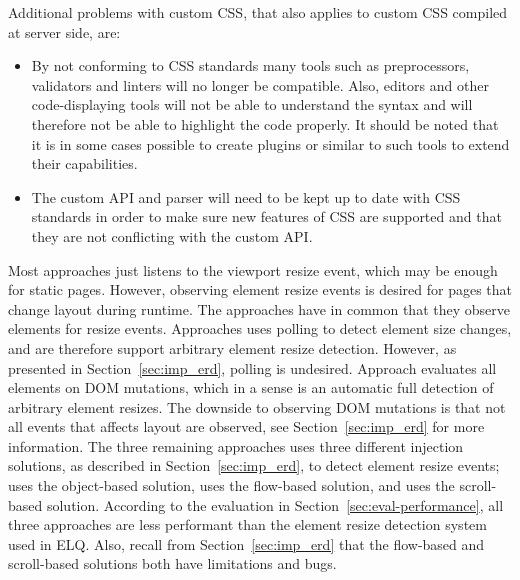 \documentclass[a4paper,11pt]{kth-mag}
\begin{document}
    Additional problems with custom \gls{CSS}, that also applies to custom \gls{CSS} compiled at server side, are:
    \begin{itemize}
      \item 
        By not conforming to \gls{CSS} standards many tools such as preprocessors, validators and linters will no longer be compatible.
        Also, editors and other code-displaying tools will not be able to understand the syntax and will therefore not be able to highlight the code properly.
        It should be noted that it is in some cases possible to create plugins or similar to such tools to extend their capabilities.
      \item The custom \gls{API} and parser will need to be kept up to date with \gls{CSS} standards in order to make sure new features of \gls{CSS} are supported and that they are not conflicting with the custom \gls{API}.
    \end{itemize}

    Most approaches just listens to the viewport resize event, which may be enough for static pages.
    However, observing element resize events is desired for pages that change layout during runtime.
    The approaches \cite{eq_imp_localised-css,eq_imp_selector_queries,eq_imp_prollyfill-min-width,eq_imp_gss,eq_imp_element-queries,eq_imp_css-element-queries} have in common that they observe elements for resize events.
    Approaches \cite{eq_imp_localised-css,eq_imp_selector_queries} uses polling to detect element size changes, and are therefore support arbitrary element resize detection.
    However, as presented in Section~\ref{sec:imp_erd}, polling is undesired.
    Approach \cite{eq_imp_gss} evaluates all elements on \gls{DOM} mutations, which in a sense is an automatic full detection of arbitrary element resizes.
    The downside to observing \gls{DOM} mutations is that not all events that affects layout are observed, see Section~\ref{sec:imp_erd} for more information.
    The three remaining approaches uses three different injection solutions, as described in Section~\ref{sec:imp_erd}, to detect element resize events; \cite{eq_imp_element-queries} uses the object-based solution, \cite{eq_imp_prollyfill-min-width} uses the flow-based solution, and \cite{eq_imp_css-element-queries} uses the scroll-based solution.
    According to the evaluation in Section~\ref{sec:eval-performance}, all three approaches are less performant than the element resize detection system used in \gls{ELQ}.
    Also, recall from Section~\ref{sec:imp_erd} that the flow-based and scroll-based solutions both have limitations and bugs.
\end{document}
